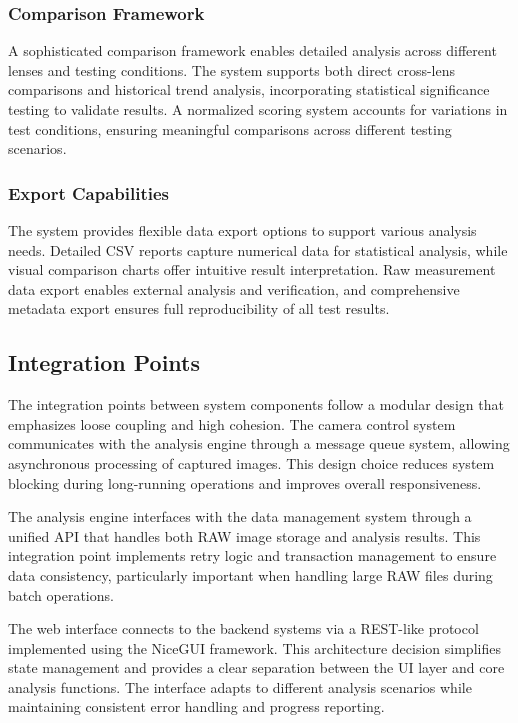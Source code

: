 \subsubsection{Comparison Framework}
A sophisticated comparison framework enables detailed analysis across different lenses and testing conditions. The system supports both direct cross-lens comparisons and historical trend analysis, incorporating statistical significance testing to validate results. A normalized scoring system accounts for variations in test conditions, ensuring meaningful comparisons across different testing scenarios.

\subsubsection{Export Capabilities}
The system provides flexible data export options to support various analysis needs. Detailed CSV reports capture numerical data for statistical analysis, while visual comparison charts offer intuitive result interpretation. Raw measurement data export enables external analysis and verification, and comprehensive metadata export ensures full reproducibility of all test results.

\subsection{Integration Points} 
The integration points between system components follow a modular design that emphasizes loose coupling and high cohesion. The camera control system communicates with the analysis engine through a message queue system, allowing asynchronous processing of captured images. This design choice reduces system blocking during long-running operations and improves overall responsiveness.

The analysis engine interfaces with the data management system through a unified API that handles both RAW image storage and analysis results. This integration point implements retry logic and transaction management to ensure data consistency, particularly important when handling large RAW files during batch operations.

The web interface connects to the backend systems via a REST-like protocol implemented using the NiceGUI framework. This architecture decision simplifies state management and provides a clear separation between the UI layer and core analysis functions. The interface adapts to different analysis scenarios while maintaining consistent error handling and progress reporting.

